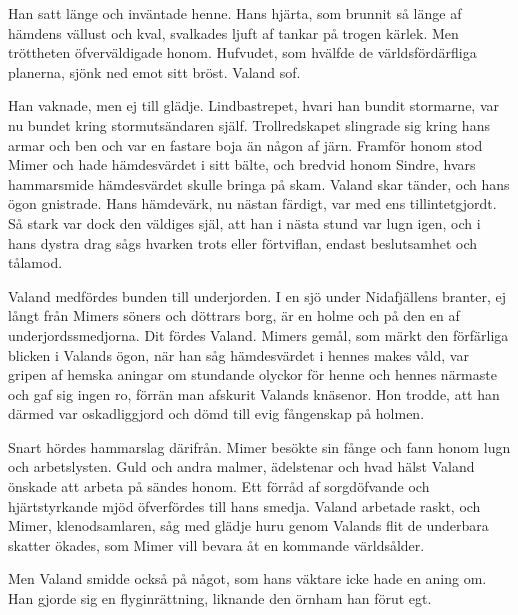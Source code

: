 Han satt länge och inväntade henne. Hans hjärta, som brunnit så länge af
hämdens vällust och kval, svalkades ljuft af tankar på trogen kärlek.
Men tröttheten öfverväldigade honom. Hufvudet, som hvälfde de
världsfördärfliga planerna, sjönk ned emot sitt bröst. Valand sof.

Han vaknade, men ej till glädje. Lindbastrepet, hvari
\protect\hypertarget{lb1625905.xhtmlux5cux23start100}{}{}\protect\hypertarget{lb1625905.xhtmlux5cux23start100-a}{}{}\protect\hypertarget{lb1625905.xhtmlux5cux23start100-b}{}{}\protect\hypertarget{lb1625905.xhtmlux5cux23start100-c}{}{}\protect\hypertarget{lb1625905.xhtmlux5cux23start100-d}{}{}
han bundit stormarne, var nu bundet kring stormutsändaren själf.
Trollredskapet slingrade sig kring hans armar och ben och var en fastare
boja än någon af järn. Framför honom stod Mimer och hade hämdesvärdet i
sitt bälte, och bredvid honom Sindre, hvars hammarsmide hämdesvärdet
skulle bringa på skam. Valand skar tänder, och hans ögon gnistrade. Hans
hämdevärk, nu nästan färdigt, var med ens tillintetgjordt. Så stark var
dock den väldiges själ, att han i nästa stund var lugn igen, och i hans
dystra drag sågs hvarken trots eller förtviflan, endast beslutsamhet och
tålamod.

Valand medfördes bunden till underjorden. I en sjö under Nidafjällens
branter, ej långt från Mimers söners och döttrars borg, är en holme och
på den en af underjordssmedjorna. Dit fördes Valand. Mimers gemål, som
märkt den förfärliga blicken i Valands ögon, när han såg hämdesvärdet i
hennes makes våld, var gripen af hemska aningar om stundande olyckor för
henne och hennes närmaste och gaf sig ingen ro, förrän man afskurit
Valands knäsenor. Hon trodde, att han därmed var oskadliggjord och dömd
till evig fångenskap på holmen.

Snart hördes hammarslag därifrån. Mimer besökte sin fånge och fann honom
lugn och arbetslysten. Guld och andra malmer, ädelstenar och hvad hälst
Valand önskade att arbeta på sändes honom. Ett förråd af sorgdöfvande
och hjärtstyrkande mjöd öfverfördes till hans smedja. Valand arbetade
raskt, och Mimer, klenodsamlaren, såg med glädje huru genom Valands flit
de underbara skatter ökades, som Mimer vill bevara åt en kommande
världsålder.

Men Valand smidde också på något, som hans väktare icke hade en aning
om. Han gjorde sig en flyginrättning, liknande den örnham han förut egt.

